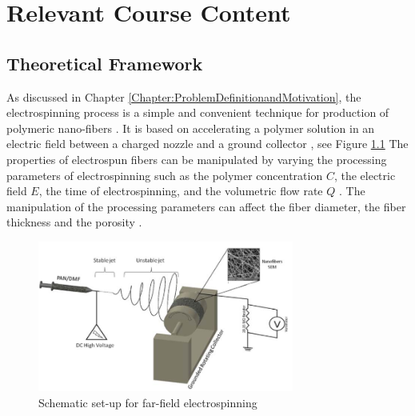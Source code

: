 \chapter{Relevant Course Content} %

\label{Chapter:RelevantCourseContent}

\section{Theoretical Framework}
As discussed in Chapter \ref{Chapter:ProblemDefinitionandMotivation}, the electrospinning process is a simple and convenient technique for production of polymeric nano-fibers \cite{Lee2007}. It is based on accelerating a polymer solution in an electric field between a charged nozzle and a ground collector \cite{Shin2001a}, see Figure \ref{fig:electrospinningSetup} The properties of electrospun fibers can be manipulated by varying the processing parameters of electrospinning such as the polymer concentration $C$, the electric field $E$, the time of electrospinning, and the volumetric flow rate $Q$ \cite{Leung2010}. The manipulation of the processing parameters can affect the fiber diameter, the fiber thickness and the porosity \cite{Abuzade2012, Leung2010}.

\begin{figure}[th]
\centering
\includegraphics[width=0.75\textwidth]{./Figures/electrospinningSetup.png}
\decoRule
\caption[Far-Field Electrospinning Setup]{Schematic set-up for far-field electrospinning \cite{Nagham2017}}
\label{fig:electrospinningSetup}
\end{figure}

